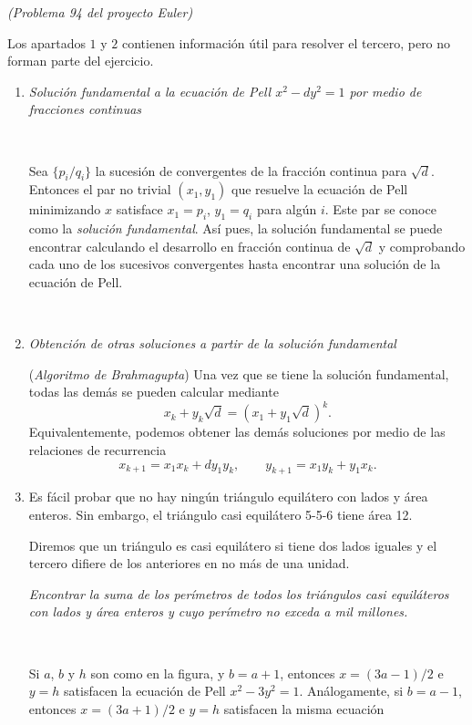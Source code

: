 	
	\begin{ejer}	{\itshape (Problema 94 del proyecto Euler)} 
		
		
		Los apartados $1$ y $2$ contienen informaci\'on \'util para resolver el tercero, pero no forman parte del ejercicio.
	

\begin{enumerate}

\item  {\it Solución fundamental a la ecuación de Pell $x^2-dy^2=1$ por medio de fracciones continuas}
 
 \
 
 Sea $\{p_i/q_i\}$ la sucesión de convergentes de la fracción continua para $\sqrt{d}$. Entonces el par no trivial $(x_1,y_1)$ que resuelve la ecuación de Pell minimizando $x$ satisface $x_1=p_i$, $y_1=q_i$ para algún $i$. Este par se conoce como la \emph{solución fundamental}. Así pues, la solución fundamental se puede encontrar calculando el desarrollo en fracción continua de $\sqrt{d}$ y comprobando cada uno de los sucesivos convergentes hasta encontrar una solución de la ecuación de Pell.
 
 \
 
 \item {\it Obtención de otras soluciones a partir de la solución fundamental}
 
 
  \noindent ({\sl Algoritmo de Brahmagupta}) Una vez que se tiene la solución fundamental, todas las demás se pueden calcular mediante
 $$x_k+y_k\sqrt{d}=(x_1+y_1\sqrt{d})^k.$$
 Equivalentemente, podemos obtener las demás soluciones por medio de las relaciones de recurrencia
 $$x_{k+1}=x_1x_k+dy_1y_k,\qquad y_{k+1}=x_1 y_k+y_1x_k.$$
 
 
 
\item Es fácil probar que no hay ningún triángulo equilátero con lados y área enteros. Sin embargo, el triángulo casi equilátero 5-5-6 tiene área 12. 
	
	Diremos que un triángulo es casi equilátero si tiene dos lados iguales y el tercero difiere de los anteriores en no más de una unidad.
	
	\sl Encontrar la suma de los perímetros de todos los triángulos casi equiláteros con lados y área enteros y cuyo perímetro no exceda a mil millones. \rm
	
	\
	
	
	 Si $a$, $b$ y $h$ son como en la figura, y $b=a+1$, entonces $x=(3a -1)/2$ e $y=h$  satisfacen la ecuación de Pell $x^2-3y^2=1$. Análogamente, si $b=a-1$, entonces $x=(3a +1)/2$ e $y=h$ satisfacen la misma ecuación
	

\end{enumerate}
\end{ejer}
